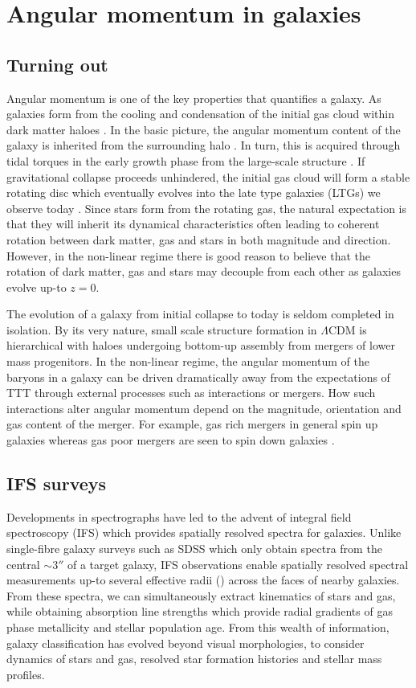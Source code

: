 \section{Angular momentum in galaxies} \label{sec:ang_mom_intro}
\subsection{Turning out}
Angular momentum is one of the key properties that quantifies a galaxy. As galaxies form from the cooling and condensation of the initial gas cloud within dark matter haloes \citep{white1978, mo1998}. In the basic picture, the angular momentum content of the galaxy is inherited from the surrounding halo \citep[][]{fall1980}. In turn, this is acquired through tidal torques in the early growth phase from the large-scale structure \citep[e.g.][]{peebles1969, Doroshkevich1970}. If gravitational collapse proceeds unhindered, the initial gas cloud will form a stable rotating disc which eventually evolves into the late type galaxies (LTGs) we observe today \citep{white1978}. Since stars form from the rotating gas, the natural expectation is that they will inherit its dynamical characteristics often leading to coherent rotation between dark matter, gas and stars in both magnitude and direction. However, in the non-linear regime there is good reason to believe that the rotation of dark matter, gas and stars may decouple from each other as galaxies evolve up-to $z=0$. 

The evolution of a galaxy from initial collapse to today is seldom completed in isolation. By its very nature, small scale structure formation in $\Lambda$CDM is hierarchical with haloes undergoing bottom-up assembly from mergers of lower mass progenitors. In the non-linear regime, the angular momentum of the baryons in a galaxy can be driven dramatically away from the expectations of TTT through external processes such as interactions or mergers. How such interactions alter angular momentum depend on the magnitude, orientation and gas content of the merger. For example, gas rich mergers in general spin up galaxies whereas gas poor mergers are seen to spin down galaxies \citep[][]{lagos2017,lagos2018}.

\subsection{IFS surveys} \label{sec:ifs_surveys_intro}
Developments in spectrographs have led to the advent of integral field spectroscopy (IFS) which provides spatially resolved spectra for galaxies. Unlike single-fibre galaxy surveys such as SDSS which only obtain spectra from the central $\sim 3 ''$ of a target galaxy, IFS observations enable spatially resolved spectral measurements up-to several effective radii (\re) across the faces of nearby galaxies. From these spectra, we can simultaneously extract kinematics of stars and gas, while obtaining absorption line strengths which provide radial gradients of gas phase metallicity and stellar population age. From this wealth of information, galaxy classification has evolved beyond visual morphologies, to consider dynamics of stars and gas, resolved star formation histories and stellar mass profiles. 

